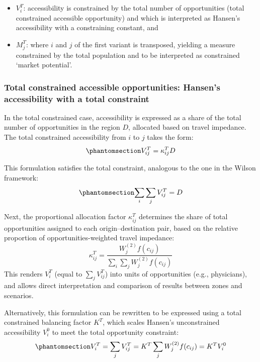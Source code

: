 \documentclass[
  10pt,
  letterpaper,
]{article}
\providecommand{\tightlist}{%
  \setlength{\itemsep}{0pt}\setlength{\parskip}{0pt}}\usepackage{longtable,booktabs,array}
\begin{document}
\begin{itemize}
\tightlist
\item
  \(V_i^T\): accessibility is constrained by the total number of
  opportunities (total constrained accessible opportunity) and which is
  interpreted as Hansen's accessibility with a constraining constant,
  and
\item
  \(M_j^T\): where \(i\) and \(j\) of the first variant is transposed,
  yielding a measure constrained by the total population and to be
  interpreted as constrained `market potential'.
\end{itemize}

\subsubsection{Total constrained accessible opportunities: Hansen's
accessibility with a total
constraint}\label{total-constrained-accessible-opportunities-hansens-accessibility-with-a-total-constraint}

In the total constrained case, accessibility is expressed as a share of
the total number of opportunities in the region \(D\), allocated based
on travel impedance. The total constrained accessibility from \(i\) to
\(j\) takes the form:
\begin{equation}\phantomsection\label{eq-total-constrained-access}{
V^T_{ij} = \kappa_{ij}^T D
}\end{equation}

This formulation satisfies the total constraint, analogous to the one in
the Wilson framework:
\begin{equation}\phantomsection\label{eq-total-constraint-D}{
\sum_i \sum_j V^T_{ij} =  D
}\end{equation}

Next, the proportional allocation factor \(\kappa_{ij}^T\) determines
the share of total opportunities assigned to each origin--destination
pair, based on the relative proportion of opportunities-weighted travel
impedance: \[
\kappa_{ij}^T = \frac{W^{(2)}_j f(c_{ij})}{\sum_i\sum_j W^{(2)}_jf(c_{ij})}
\] This renders \(V_i^T\) (equal to \(\sum_jV_{ij}^T\)) into units of
opportunities (e.g., physicians), and allows direct interpretation and
comparison of results between zones and scenarios.

Alternatively, this formulation can be rewritten to be expressed using a
total constrained balancing factor \(K^T\), which scales Hansen's
unconstrained accessibility \(V_i^0\) to meet the total opportunity
constraint:
\begin{equation}\phantomsection\label{eq-total-constrained-accessibility}{
V^T_i = \sum_j V^T_{ij} = K^T \sum_j W^{(2)}_jf(c_{ij}) = K^T  V^0_i
}\end{equation}
\end{document}
